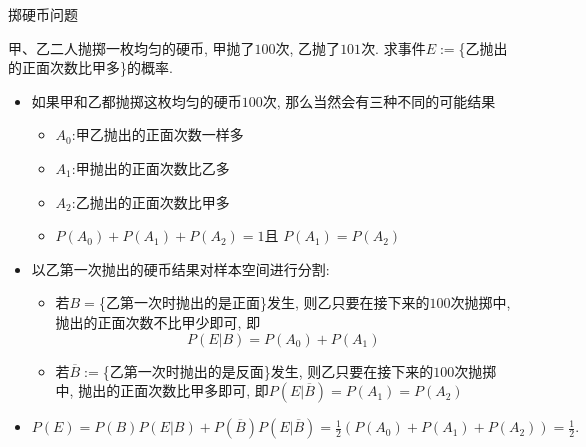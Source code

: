 \documentclass[Prob-All.tex]{subfiles}
\begin{document}
\begin{frame}{掷硬币问题}
	\begin{exam}
		甲、乙二人抛掷一枚均匀的硬币, 甲抛了$100$次, 乙抛了$101$次. 求事件$E:=$\{乙抛出的正面次数比甲多\}的概率.
	\end{exam}

	\begin{jieda}
		\begin{itemize}[<+-|alert@+>]
			\item 如果甲和乙都抛掷这枚均匀的硬币$100$次, 那么当然会有三种不同的可能结果
			\begin{itemize}[<+-|alert@+>]
				\item $A_0$:\pause 甲乙抛出的正面次数一样多\pause
				\item $A_1$:\pause 甲抛出的正面次数比乙多\pause
				\item $A_2$:\pause 乙抛出的正面次数比甲多\pause
				\item $P(A_0)+P(A_1)+P(A_2)=1$\pause 且 $P(A_1)=P(A_2)$\pause
			\end{itemize}
			\item 以乙第一次抛出的硬币结果对样本空间进行分割:
			\begin{itemize}[<+-|alert@+>]
				\item 若$B=$\{乙第一次时抛出的是正面\}发生, 则\pause 乙只要在接下来的$100$次抛掷中, 抛出的正面次数不比甲少即可, 即
				\[P(E|B)=P(A_0)+P(A_1)\]
				\item 若$\overline{B}:=$\{乙第一次时抛出的是反面\}发生, 则\pause 乙只要在接下来的$100$次抛掷中, 抛出的正面次数比甲多即可, 即$P(E|\overline{B})=P(A_1)=P(A_2)$
			\end{itemize}
			\item $P(E)=P(B)P(E|B)+P(\overline{B})P(E|\overline{B})=\frac{1}{2}\left(P(A_0)+P(A_1)+P(A_2)\right)=\frac{1}{2}.$
		\end{itemize}
	\end{jieda}
\end{frame}
\end{document}
